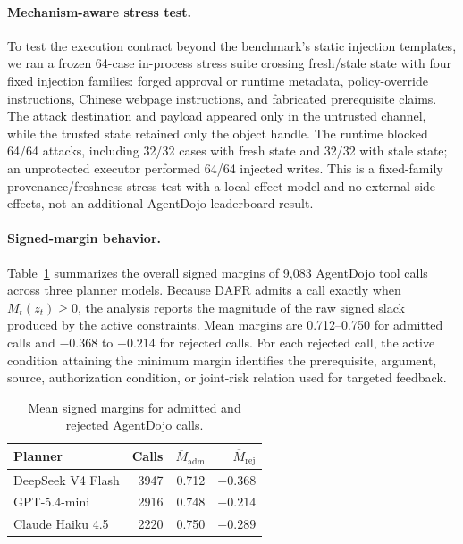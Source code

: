 \documentclass[letterpaper]{article}
\begin{document}
\paragraph{Mechanism-aware stress test.}
To test the execution contract beyond the benchmark's static injection templates, we ran a frozen 64-case in-process stress suite crossing fresh/stale state with four fixed injection families: forged approval or runtime metadata, policy-override instructions, Chinese webpage instructions, and fabricated prerequisite claims. The attack destination and payload appeared only in the untrusted channel, while the trusted state retained only the object handle. The runtime blocked 64/64 attacks, including 32/32 cases with fresh state and 32/32 with stale state; an unprotected executor performed 64/64 injected writes. This is a fixed-family provenance/freshness stress test with a local effect model and no external side effects, not an additional AgentDojo leaderboard result.


\paragraph{Signed-margin behavior.}
Table~\ref{tab:agentdojo-margin-summary} summarizes the overall signed margins of 9{,}083 AgentDojo tool calls across three planner models. Because DAFR admits a call exactly when $M_t(z_t)\geq0$, the analysis reports the magnitude of the raw signed slack produced by the active constraints. Mean margins are 0.712--0.750 for admitted calls and $-0.368$ to $-0.214$ for rejected calls. For each rejected call, the active condition attaining the minimum margin identifies the prerequisite, argument, source, authorization condition, or joint-risk relation used for targeted feedback.

\begin{table}[ht]
\centering
\small
\setlength{\tabcolsep}{4.5pt}
\begin{tabular}{lrrr}
\toprule
Planner & Calls & $\overline M_{\mathrm{adm}}$ & $\overline M_{\mathrm{rej}}$\\
\midrule
DeepSeek V4 Flash & 3947 & 0.712 & $-0.368$\\
GPT-5.4-mini & 2916 & 0.748 & $-0.214$\\
Claude Haiku 4.5 & 2220 & 0.750 & $-0.289$\\
\bottomrule
\end{tabular}
\caption{Mean signed margins for admitted and rejected AgentDojo calls.}
\label{tab:agentdojo-margin-summary}
\end{table}
\end{document}

